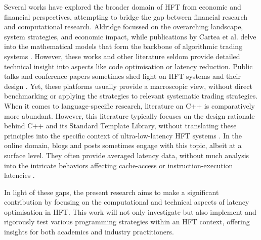 \documentclass{article}
\theoremstyle{break}
\begin{document}
Several works have explored the broader domain of HFT from economic and financial perspectives, attempting to bridge the gap between financial research and computational research. Aldridge focussed on the overarching landscape, system strategies, and economic impact, while publications by Cartea et al. delve into the mathematical models that form the backbone of algorithmic trading systems \cite{2, 7}. However, these works and other literature seldom provide detailed technical insight into aspects like code optimisation or latency reduction. Public talks and conference papers sometimes shed light on HFT systems and their design \cite{3}. Yet, these platforms usually provide a macroscopic view, without direct benchmarking or applying the strategies to relevant systematic trading strategies. When it comes to language-specific research, literature on C++ is comparatively more abundant. However, this literature typically focuses on the design rationale behind C++ and its Standard Template Library, without translating these principles into the specific context of ultra-low-latency HFT systems \cite{8, 9, 10, 11}. In the online domain, blogs and posts sometimes engage with this topic, albeit at a surface level. They often provide averaged latency data, without much analysis into the intricate behaviors affecting cache-access or instruction-execution latencies \cite{17,18,19,20,21}. 

In light of these gaps, the present research aims to make a significant contribution by focusing on the computational and technical aspects of latency optimisation in HFT. This work will not only investigate but also implement and rigorously test various programming strategies within an HFT context, offering insights for both academics and industry practitioners.
\end{document}
